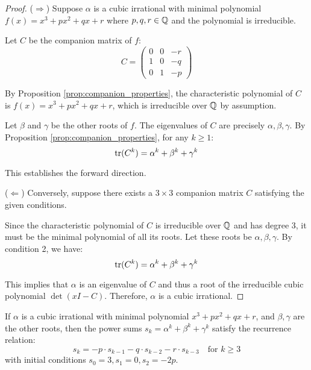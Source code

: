 \begin{proof}
($\Rightarrow$) Suppose $\alpha$ is a cubic irrational with minimal polynomial $f(x) = x^3 + px^2 + qx + r$ where $p, q, r \in \mathbb{Q}$ and the polynomial is irreducible.

Let $C$ be the companion matrix of $f$:
\begin{equation}
C = \begin{pmatrix}
0 & 0 & -r \\
1 & 0 & -q \\
0 & 1 & -p
\end{pmatrix}
\end{equation}

By Proposition \ref{prop:companion_properties}, the characteristic polynomial of $C$ is $f(x) = x^3 + px^2 + qx + r$, which is irreducible over $\mathbb{Q}$ by assumption.

Let $\beta$ and $\gamma$ be the other roots of $f$. The eigenvalues of $C$ are precisely $\alpha, \beta, \gamma$. By Proposition \ref{prop:companion_properties}, for any $k \geq 1$:
\begin{equation}
\operatorname{tr}(C^k) = \alpha^k + \beta^k + \gamma^k
\end{equation}

This establishes the forward direction.

($\Leftarrow$) Conversely, suppose there exists a $3 \times 3$ companion matrix $C$ satisfying the given conditions.

Since the characteristic polynomial of $C$ is irreducible over $\mathbb{Q}$ and has degree 3, it must be the minimal polynomial of all its roots. Let these roots be $\alpha, \beta, \gamma$. By condition 2, we have:
\begin{equation}
\operatorname{tr}(C^k) = \alpha^k + \beta^k + \gamma^k
\end{equation}

This implies that $\alpha$ is an eigenvalue of $C$ and thus a root of the irreducible cubic polynomial $\det(xI - C)$. Therefore, $\alpha$ is a cubic irrational.
\end{proof}

\begin{corollary}\label{cor:power_sums}
If $\alpha$ is a cubic irrational with minimal polynomial $x^3 + px^2 + qx + r$, and $\beta, \gamma$ are the other roots, then the power sums $s_k = \alpha^k + \beta^k + \gamma^k$ satisfy the recurrence relation:
\begin{equation}
s_k = -p \cdot s_{k-1} - q \cdot s_{k-2} - r \cdot s_{k-3} \quad \text{for } k \geq 3
\end{equation}
with initial conditions $s_0 = 3, s_1 = 0, s_2 = -2p$.
\end{corollary}

